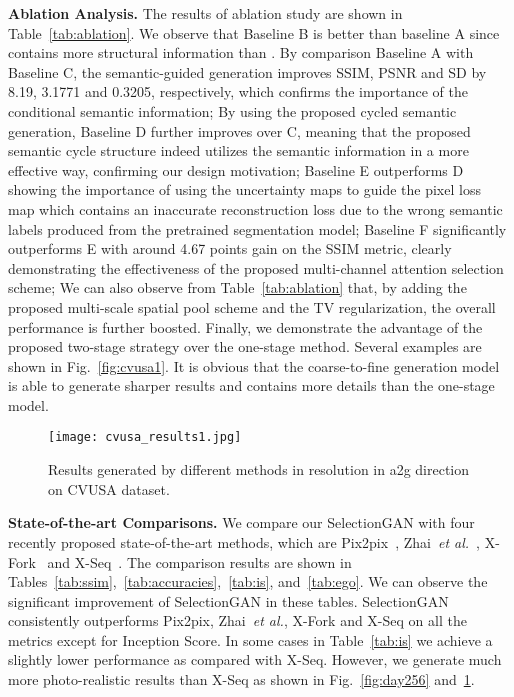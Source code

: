 \documentclass[10pt,twocolumn,letterpaper]{article}
\begin{document}
\noindent \textbf{Ablation Analysis.}
The results of ablation study are shown in Table~\ref{tab:ablation}. We observe that Baseline B is better than baseline A since  contains more structural information than . By comparison Baseline A with Baseline C, the semantic-guided generation improves SSIM, PSNR and SD by 8.19, 3.1771 and 0.3205, respectively, which confirms the importance of the conditional semantic information;
By using the proposed cycled semantic generation, Baseline D further improves over C, meaning that the proposed semantic cycle structure indeed utilizes the semantic information in a more effective way, confirming our design motivation;
Baseline E outperforms D showing the importance of using the uncertainty maps to guide the pixel loss map which contains an inaccurate reconstruction loss due to the wrong semantic labels produced from the pretrained segmentation model;
Baseline F significantly outperforms E with around 4.67 points gain on the SSIM metric, clearly demonstrating the effectiveness of the proposed multi-channel attention selection scheme;
We can also observe from Table~\ref{tab:ablation} that, by adding the proposed multi-scale spatial pool scheme and the TV regularization, the overall performance is further boosted.
Finally, we demonstrate the advantage of the proposed two-stage strategy over the one-stage method. Several examples are shown in Fig.~\ref{fig:cvusa1}. It is obvious that the coarse-to-fine generation model is able to generate sharper results and contains more details than the one-stage model.

\begin{figure}[!t] \small
	\centering
	\texttt{[image: cvusa\_results1.jpg]}
	\caption{Results generated by different methods in  resolution in a2g direction on CVUSA dataset.
	}
	\label{fig:cvusa_comparsion}
\end{figure}

\noindent \textbf{State-of-the-art Comparisons.}
We compare our SelectionGAN with four recently proposed state-of-the-art methods, which are Pix2pix~\cite{isola2017image}, Zhai~\emph{et al.}~\cite{zhai2017predicting}, X-Fork~\cite{regmi2018cross} and X-Seq~\cite{regmi2018cross}.
The comparison results are shown in Tables~\ref{tab:ssim},~\ref{tab:accuracies},~\ref{tab:is}, and~\ref{tab:ego}.
We can observe the significant improvement of SelectionGAN in these tables. SelectionGAN consistently outperforms Pix2pix, Zhai~\emph{et al.}, X-Fork and X-Seq on all the metrics except for Inception Score. In some cases in Table~\ref{tab:is} we achieve a slightly lower performance as compared with X-Seq. However, we generate much more photo-realistic results than X-Seq as shown in Fig.~\ref{fig:day256} and~\ref{fig:cvusa_comparsion}.
\end{document}
